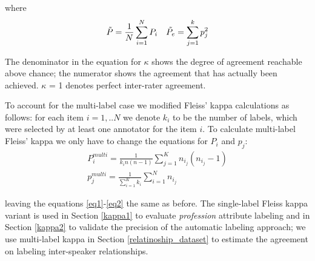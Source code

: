 \documentclass[11pt, oneside]{book}
\begin{document}
where
\begin{align} \Tilde{P} = \frac{1}{N} \sum_{i=1}^N P_i &&
    \Tilde{P_e} = \sum_{j=1}^k p_j^2
    \label{eq2}
\end{align}

The denominator in the equation for $\kappa$ shows the degree of agreement reachable above chance; the numerator shows the agreement that has actually been achieved. $\kappa$ = 1 denotes perfect inter-rater agreement.

To account for the multi-label case we modified Fleiss' kappa calculations as follows: for each item $i=1,..N$ we denote $k_i$ to be  the number of labels, which were selected by at least one annotator for the item $i$. To calculate multi-label Fleiss' kappa we only have to change the equations for $P_i$ and $p_j$:
\begin{align}
    P^{multi}_i = \frac{1}{k_i n (n-1)} \sum_{j=1}^K n_i_j(n_i_j - 1) \\
    p^{multi}_j = \frac{1}{\sum_{i=1}^K k_i} \sum_{i=1}^N n_i_j
\end{align}

leaving the equations \ref{eq1}-\ref{eq2} the same as before. The single-label Fleiss kappa variant is used in Section \ref{kappa1} to evaluate \textit{profession} attribute labeling and in Section \ref{kappa2} to validate the precision of the automatic labeling approach; we use multi-label kappa in Section \ref{relatinoship_dataset} to estimate the agreement on labeling inter-speaker relationships.






\end{document}
